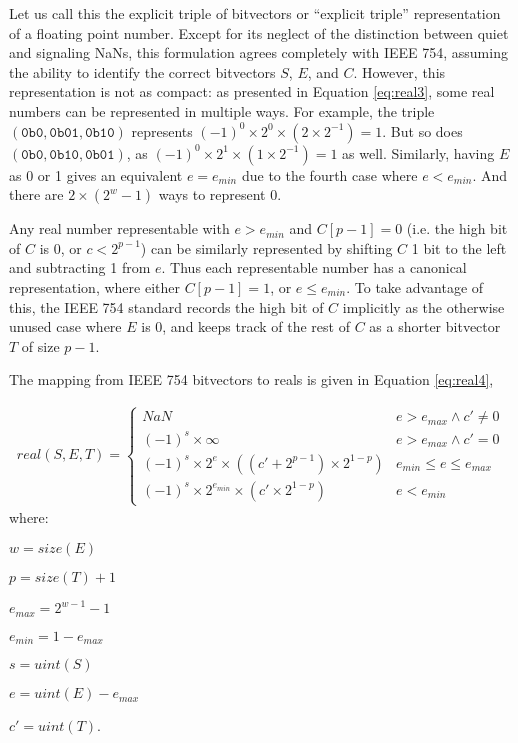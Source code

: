 \documentclass[letterpaper,10pt]{article}
\begin{document}
Let us call this the explicit triple of bitvectors or ``explicit triple'' representation of a floating point number. Except for its neglect of the distinction between quiet and signaling NaNs, this formulation agrees completely with IEEE 754, assuming the ability to identify the correct bitvectors $S$, $E$, and $C$. However, this representation is not as compact: as presented in Equation \ref{eq:real3}, some real numbers can be represented in multiple ways. For example, the triple $(\texttt{0b0}, \texttt{0b01}, \texttt{0b10})$ represents $(-1)^0 \times 2^0 \times (2 \times 2^{-1}) = 1$. But so does $(\texttt{0b0}, \texttt{0b10}, \texttt{0b01})$, as $(-1)^0 \times 2^1 \times (1 \times 2^{-1}) = 1$ as well. Similarly, having $E$ as 0 or 1 gives an equivalent $e = e_{min}$ due to the fourth case where $e < e_{min}$. And there are $2 \times (2^w - 1)$ ways to represent 0.

Any real number representable with $e > e_{min}$ and $C[p-1] = 0$ (i.e. the high bit of $C$ is 0, or $c < 2^{p-1}$) can be similarly represented by shifting $C$ 1 bit to the left and subtracting 1 from $e$. Thus each representable number has a canonical representation, where either $C[p-1] = 1$, or $e \leq e_{min}$. To take advantage of this, the IEEE 754 standard records the high bit of $C$ implicitly as the otherwise unused case where $E$ is 0, and keeps track of the rest of $C$ as a shorter bitvector $T$ of size $p - 1$.

The mapping from IEEE 754 bitvectors to reals is given in Equation \ref{eq:real4},

\begin{align} \label{eq:real4}
 real(S, E, T) =
 \begin{cases}
  NaN                                                         & e > e_{max} \land c' \neq 0  \\
  (-1)^s \times \infty                                        & e > e_{max} \land c' = 0     \\
  (-1)^s \times 2^{e} \times ((c' + 2^{p-1}) \times 2^{1-p})  & e_{min} \leq e \leq e_{max} \\
  (-1)^s \times 2^{e_{min}} \times (c' \times 2^{1 - p})      & e < e_{min}
 \end{cases}
\end{align}
where:
\begin{description}
 \item $w = size(E)$
 \item $p = size(T) + 1$
 \item $e_{max} = 2^{w-1} - 1$
 \item $e_{min} = 1 - e_{max}$
 \item $s = uint(S)$
 \item $e = uint(E) - e_{max}$
 \item $c' = uint(T)$.
\end{description}
\end{document}
